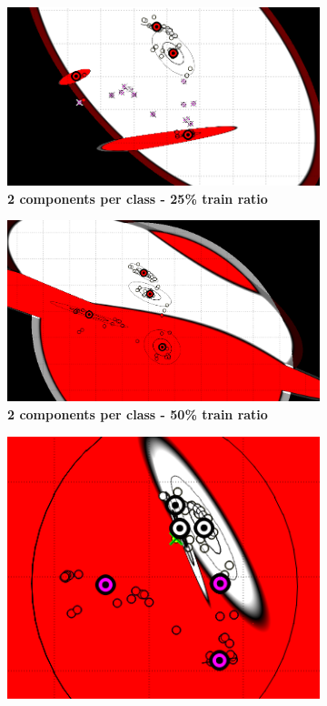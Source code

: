 \begin{figure} [ht]
\centering
	\begin{subfigure}[h]{0.20\textwidth}
    \centering
	\includegraphics[height=0.08\textheight]{./classification/gmm_2_25pourcent_full_var.png}
	\caption{\bf 2 components per class - 25\% train ratio}
	\end{subfigure}
	\hfill
	\begin{subfigure}[h]{0.20\textwidth}
    \centering
	\includegraphics[height=0.08\textheight]{./classification/gmm_2_50pourcent_full_var.png}
	\caption{\bf 2 components per class - 50\% train ratio}
	\end{subfigure}%
	\hfill
    \begin{subfigure}[h]{0.20\textwidth}
    \centering
    \includegraphics[height=0.08\textheight]{./classification/gmm_5_25pourcent_full_var.png}

\end{subfigure}
\end{figure}
